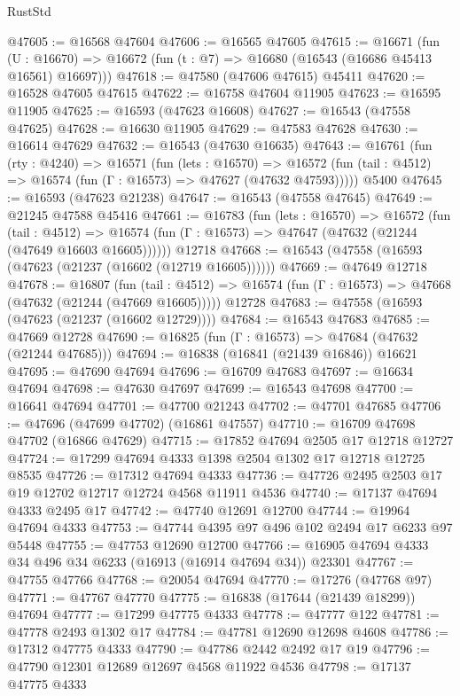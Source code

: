 \begin{lexlean}{RustStd}
\begin{coremodule}
@47605 := @16568 @47604
@47606 := @16565 @47605
@47615 := @16671
    (fun (U : @16670) => @16672 (fun (t : @7) => @16680 (@16543 (@16686 @45413 @16561) @16697)))
@47618 := @47580 (@47606 @47615) @45411
@47620 := @16528 @47605 @47615
@47622 := @16758 @47604 @11905
@47623 := @16595 @11905
@47625 := @16593 (@47623 @16608)
@47627 := @16543 (@47558 @47625)
@47628 := @16630 @11905
@47629 := @47583 @47628
@47630 := @16614 @47629
@47632 := @16543 (@47630 @16635)
@47643 := @16761
    (fun (rty : @4240) =>
    @16571
      (fun (lets : @16570) =>
      @16572 (fun (tail : @4512) => @16574 (fun (Γ : @16573) => @47627 (@47632 @47593)))))
    @5400
@47645 := @16593 (@47623 @21238)
@47647 := @16543 (@47558 @47645)
@47649 := @21245 @47588 @45416
@47661 := @16783
    (fun (lets : @16570) =>
    @16572
      (fun (tail : @4512) =>
      @16574 (fun (Γ : @16573) => @47647 (@47632 (@21244 (@47649 @16603 @16605))))))
    @12718
@47668 := @16543 (@47558 (@16593 (@47623 (@21237 (@16602 (@12719 @16605))))))
@47669 := @47649 @12718
@47678 := @16807
    (fun (tail : @4512) => @16574 (fun (Γ : @16573) => @47668 (@47632 (@21244 (@47669 @16605)))))
    @12728
@47683 := @47558 (@16593 (@47623 (@21237 (@16602 @12729))))
@47684 := @16543 @47683
@47685 := @47669 @12728
@47690 := @16825 (fun (Γ : @16573) => @47684 (@47632 (@21244 @47685)))
@47694 := @16838 (@16841 (@21439 @16846)) @16621
@47695 := @47690 @47694
@47696 := @16709 @47683
@47697 := @16634 @47694
@47698 := @47630 @47697
@47699 := @16543 @47698
@47700 := @16641 @47694
@47701 := @47700 @21243
@47702 := @47701 @47685
@47706 := @47696 (@47699 @47702) (@16861 @47557)
@47710 := @16709 @47698 @47702 (@16866 @47629)
@47715 := @17852 @47694 @2505 @17 @12718 @12727
@47724 := @17299 @47694 @4333 @1398 @2504 @1302 @17 @12718 @12725 @8535
@47726 := @17312 @47694 @4333
@47736 := @47726 @2495 @2503 @17 @19 @12702 @12717 @12724 @4568 @11911 @4536
@47740 := @17137 @47694 @4333 @2495 @17
@47742 := @47740 @12691 @12700
@47744 := @19964 @47694 @4333
@47753 := @47744 @4395 @97 @496 @102 @2494 @17 @6233 @97 @5448
@47755 := @47753 @12690 @12700
@47766 := @16905 @47694 @4333 @34 @496 @34 @6233 (@16913 (@16914 @47694 @34)) @23301
@47767 := @47755 @47766
@47768 := @20054 @47694
@47770 := @17276 (@47768 @97)
@47771 := @47767 @47770
@47775 := @16838 (@17644 (@21439 @18299)) @47694
@47777 := @17299 @47775 @4333
@47778 := @47777 @122
@47781 := @47778 @2493 @1302 @17
@47784 := @47781 @12690 @12698 @4608
@47786 := @17312 @47775 @4333
@47790 := @47786 @2442 @2492 @17 @19
@47796 := @47790 @12301 @12689 @12697 @4568 @11922 @4536
@47798 := @17137 @47775 @4333

\end{coremodule}
\end{lexlean}
